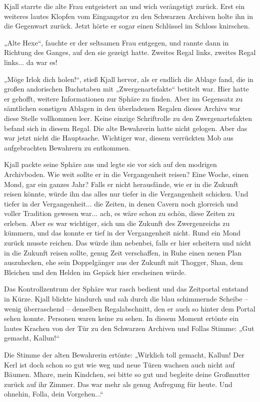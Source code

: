 Kjall starrte die alte Frau entgeistert an und wich verängstigt zurück. Erst ein weiteres lautes Klopfen vom Eingangstor zu den Schwarzen Archiven holte ihn in die Gegenwart zurück. Jetzt hörte er sogar einen Schlüssel im Schloss knirschen.

„Alte Hexe“, fauchte er der seltsamen Frau entgegen, und rannte dann in Richtung des Ganges, auf den sie gezeigt hatte. Zweites Regal links, zweites Regal links... da war es!

„Möge Irlok dich holen!“, stieß Kjall hervor, als er endlich die Ablage fand, die in großen andorischen Buchstaben mit „Zwergenartefakte“ betitelt war. Hier hatte er gehofft, weitere Informationen zur Sphäre zu finden. Aber im Gegensatz zu sämtlichen sonstigen Ablagen in den überladenen Regalen dieses Archivs war diese Stelle vollkommen leer. Keine einzige Schriftrolle zu den Zwergenartefakten befand sich in diesem Regal. Die alte Bewahrerin hatte nicht gelogen. Aber das war jetzt nicht die Hauptsache. Wichtiger war, diesem verrückten Mob aus aufgebrachten Bewahrern zu entkommen.

Kjall packte seine Sphäre aus und legte sie vor sich auf den modrigen Archivboden. Wie weit sollte er in die Vergangenheit reisen? Eine Woche, einen Mond, gar ein ganzes Jahr? Falls er nicht herausfände, wie er in die Zukunft reisen könnte, würde ihn das alles nur tiefer in die Vergangenheit schicken. Und tiefer in der Vergangenheit... die Zeiten, in denen Cavern noch glorreich und voller Tradition gewesen war... ach, es wäre schon zu schön, diese Zeiten zu erleben. Aber es war wichtiger, sich um die Zukunft des Zwergenreichs zu kümmern, und das konnte er tief in der Vergangenheit nicht. Rund ein Mond zurück musste reichen. Das würde ihm nebenbei, falls er hier scheitern und nicht in die Zukunft reisen sollte, genug Zeit verschaffen, in Ruhe einen neuen Plan auszuhecken, ehe sein Doppelgänger aus der Zukunft mit Thogger, Shan, dem Bleichen und den Helden im Gepäck hier erscheinen würde.

Das Kontrollzentrum der Sphäre war rasch bedient und das Zeitportal entstand in Kürze. Kjall blickte hindurch und sah durch die blau schimmernde Scheibe – wenig überraschend – denselben Regalabschnitt, den er auch so hinter dem Portal sehen konnte. Personen waren keine zu sehen. In diesem Moment ertönte ein lautes Krachen von der Tür zu den Schwarzen Archiven und Follas Stimme: „Gut gemacht, Kallun!“

Die Stimme der alten Bewahrerin ertönte: „Wirklich toll gemacht, Kallun! Der Kerl ist doch schon so gut wie weg und neue Türen wachsen auch nicht auf Bäumen. Mhare, mein Kindchen, sei bitte so gut und begleite deine Großmutter zurück auf ihr Zimmer. Das war mehr als genug Aufregung für heute. Und ohnehin, Folla, dein Vorgehen...“

